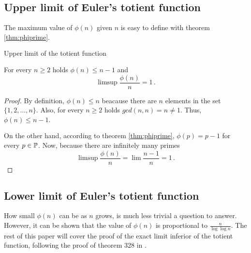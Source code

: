 \documentclass{article}
\begin{document}
\subsection{Upper limit of Euler's totient function}

The maximum value of $\phi(n)$ given $n$ is easy to define with theorem \ref{thm:phiprime}.

\begin{theorem}
Upper limit of the totient function \cite{HW:theproof}

For every $n \geq 2$ holds $\phi(n) \leq n-1$ and
\begin{equation*}
    \limsup{\frac{\phi(n)}{n}} = 1\,.
\end{equation*}

\begin{proof}

By definition, $\phi(n) \leq n$ beacause there are $n$ elements in the set $\{1,2,\dots,n\}$. Also, for every $n \geq 2$ holds $gcd(n,n) = n \neq 1$. Thus, $\phi(n) \leq n-1$.

On the other hand, according to theorem \ref{thm:phiprime}, $\phi(p) = p-1$ for every $p\in\mathbb{P}$.
Now, because there are infinitely many primes %
\begin{equation*}
    \limsup{\frac{\phi(n)}{n}} = \lim \frac{n-1}{n} = 1\,.
\end{equation*}

\end{proof}

\end{theorem}

\subsection{Lower limit of Euler's totient function}

How small $\phi(n)$ can be as $n$ grows, is much less trivial a question to answer. However, it can be shown that the value of $\phi(n)$ is proportional to $\frac{n}{\log\log n}$. The rest of this paper will cover the proof of the exact limit inferior of the totient function, following the proof of theorem $328$
in \cite{HW:theproof}.
\end{document}
